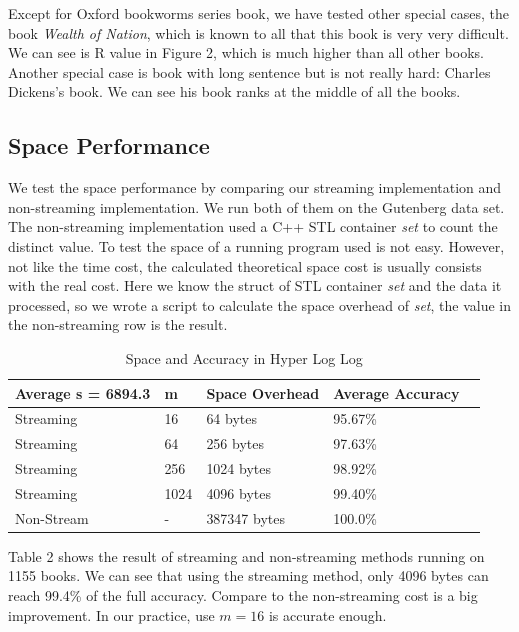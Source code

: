 \documentclass{article}
\begin{document}
Except for Oxford bookworms series book, we have tested other special cases, the book \textit{Wealth of Nation}, which is known to all that this book is very very difficult. We can see is R value in Figure 2, which is much higher than all other books. Another special case is book with long sentence but is not really hard: Charles Dickens's book. We can see his book ranks at the middle of all the books.

\subsection{Space Performance}
We test the space performance by comparing our streaming implementation and non-streaming implementation. We run both of them on the Gutenberg data set. The non-streaming implementation used a C++ STL container \textit{set} to count the distinct value. To test the space of a running program used is not easy. However, not like the time cost, the calculated theoretical space cost is usually consists with the real cost. Here we know the struct of STL container \textit{set} and the data it processed, so we wrote a script to calculate the space overhead of \textit{set}, the value in the non-streaming row is the result.
\begin{table}[H]
\begin{center}
\begin{tabular}{ | m{10em} | m{5em}| m{10em} | m{5em} | m{5em} |} 
\hline
Average s = 6894.3 & m & Space Overhead & Average Accuracy \\ 
\hline
Streaming & 16 & 64 bytes & 95.67\% \\ 
\hline
Streaming & 64 & 256 bytes & 97.63\% \\ 
\hline
Streaming & 256 & 1024 bytes & 98.92\% \\ 
\hline
Streaming & 1024 & 4096 bytes & 99.40\% \\
\hline
Non-Stream & - & 387347 bytes & 100.0\% \\
\hline
\end{tabular}
\end{center}
\caption{Space and Accuracy in Hyper Log Log} \label{tab: testtime}
\end{table}
Table 2 shows the result of streaming and non-streaming methods running on 1155 books. We can see that using the streaming method, only 4096 bytes can reach 99.4\% of the full accuracy. Compare to the non-streaming cost is a big improvement. In our practice, use $m = 16$ is accurate enough.
\end{document}
